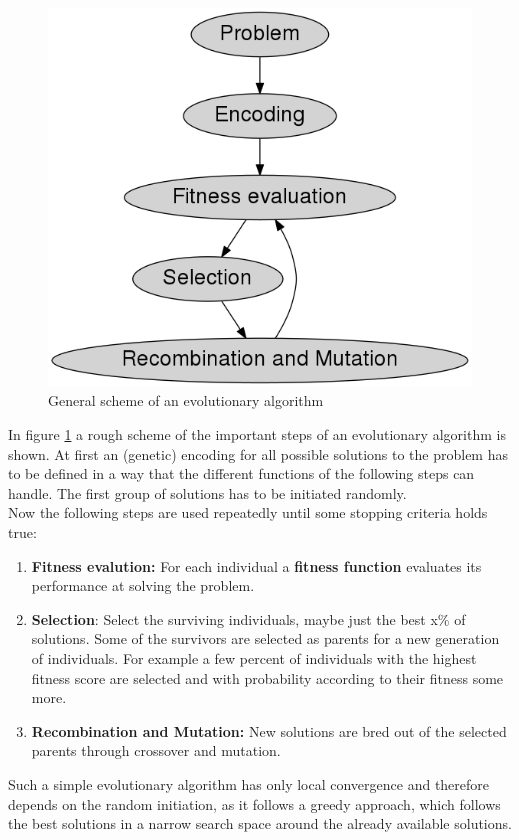 \documentclass[12pt,twoside]{article}
\theoremstyle{plain}
\theoremstyle{definition}
\theoremstyle{remark}
\begin{document}
\begin{figure}
	\begin{center}
		\includegraphics[height=.4\textwidth]{Bilder/evo.png}
	\end{center}
	\caption{General scheme of an evolutionary algorithm}
	\label{fig:evo}
\end{figure}

In figure \ref{fig:evo} a rough scheme of the important steps of an evolutionary algorithm is shown. At first an (genetic) encoding for all possible solutions to the problem has to be defined in a way that the different functions of the following steps can handle. The first group of solutions has to be initiated randomly.\\

Now the following steps are used repeatedly until some stopping criteria holds true:
\begin{enumerate}
	\item \textbf{Fitness evalution:} For each individual a \textbf{fitness function} evaluates its performance at solving the problem.
	\item \textbf{Selection}: Select the surviving individuals, maybe just the best x\% of solutions. Some of the survivors are selected as parents for a new generation of individuals. For example a few percent of individuals with the highest fitness score are selected and with probability according to their fitness some more.
	\item \textbf{Recombination and Mutation:} New solutions are bred out of the selected parents through crossover and mutation.
\end{enumerate}

Such a simple evolutionary algorithm has only local convergence and therefore depends on the random initiation, as it follows a greedy approach, which follows the best solutions in a narrow search space around the already available solutions.
\end{document}
